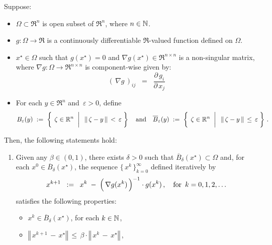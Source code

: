 \begin{theorem}
\label{NewtonRaphson}
\mbox{}\vskip 0.1cm
\noindent
Suppose:
\begin{itemize}
\item
	$\Omega \subset \Re^{n}$ is open subset of $\Re^{n}$, where $n \in \mathbb{N}$.
\item
	$g : \Omega \longrightarrow \Re$ is a continuously differentiable $\Re$-valued function
	defined on $\Omega$.
\item
	$x^{\star} \in \Omega$ such that $g(x^{\star}) = 0$ and
	$\nabla g(x^{\star}) \in \Re^{n \times n}$ is a non-singular matrix,
	where $\nabla g : \Omega \longrightarrow \Re^{n \times n}$ is component-wise given by:
	\begin{equation*}
	(\,\nabla g\,)_{ij}
	\;\; = \;\;
		\dfrac{\partial\,g_{i}}{\partial\,x_{j}}
	\end{equation*}
\item
	For each $y \in \Re^{n}$ and \,$\varepsilon > 0$, define
	\begin{equation*}
	B_{\varepsilon}(y)
	\; := \;
		\left\{\;\left.
		\zeta \overset{{\color{white}+}}{\in} \Re^{n}
		\;\;\right\vert\;\;
		\Vert\,\zeta - y\,\Vert \,<\, \varepsilon
		\;\right\}
	\quad\textnormal{and}\quad
	\overline{B}_{\varepsilon}(y)
	\; := \;
		\left\{\;\left.
		\zeta \overset{{\color{white}+}}{\in} \Re^{n}
		\;\;\right\vert\;\;
		\Vert\,\zeta - y\,\Vert \,\leq\, \varepsilon
		\;\right\}\,.
	\end{equation*}
\end{itemize}
Then, the following statements hold:
\begin{enumerate}
\item\label{NewtonRaphsonGeometricConvergence}
	Given any $\beta \in (0,1)$,
	there exists $\delta > 0$ such that $\overline{B}_{\delta}(x^{\star}) \subset \Omega$ and,
	for each $x^{0} \in \overline{B}_{\delta}(x^{\star})$, the sequence $\{\,x^{k}\,\}_{k=0}^{\infty}$
	defined iteratively by
	\begin{equation*}
	x^{k+1}
	\;\; := \;\;
		x^{k} \;-\; \left(\,\overset{{\color{white}.}}{\nabla} g(x^{k})\,\right)^{-1}\cdot g(x^{k})\,,
	\quad
	\textnormal{for \,$k = 0, 1, 2, \ldots$}
	\end{equation*}
	satisfies the following properties:
	\begin{itemize}
	\item
		$x^{k} \in \overline{B}_{\delta}(x^{\star})$, for each $k \in \mathbb{N}$,
	\item
		$\left\Vert\,x^{k+1}\,-\,x^{\star}\right\Vert \, \leq \, \beta\cdot\left\Vert\,x^{k}\,-\,x^{\star}\right\Vert$\,,

\end{itemize}
\end{enumerate}
\end{theorem}
